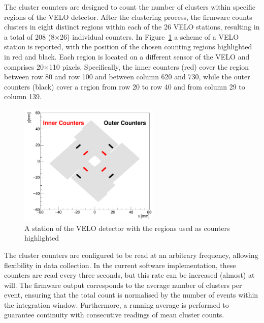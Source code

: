 The cluster counters are designed to count the number of clusters within specific regions of the VELO detector. After the clustering process, the firmware counts clusters in eight distinct regions within each of the 26 VELO stations, resulting in a total of 208 (8$\times$26) individual counters. In Figure~\ref{fig:VELO-counters} a scheme of a VELO station is reported, with the position of the chosen counting regions highlighted in red and black. Each region is located on a different sensor of the VELO and comprises 20$\times$110 pixels. Specifically, the inner counters (red) cover the region between row 80 and row 100 and between column 620 and 730, while the outer counters (black) cover a region from row 20 to row 40 and from column 29 to column 139. 


\begin{figure}
    \centering
    \includegraphics[width=0.6\textwidth]{figures/counters.png}
    \caption{A station of the VELO detector with the regions used as counters highlighted}
    \label{fig:VELO-counters}
\end{figure}

The cluster counters are configured to be read at an arbitrary frequency, allowing flexibility in data collection. In the current software implementation, these counters are read every three seconds, but this rate can be increased (almost) at will.
The firmware output corresponds to the average number of clusters per event, ensuring that the total count is normalised by the number of events within the integration window. Furthermore, a running average is performed to guarantee continuity with consecutive readings of mean cluster counts.

